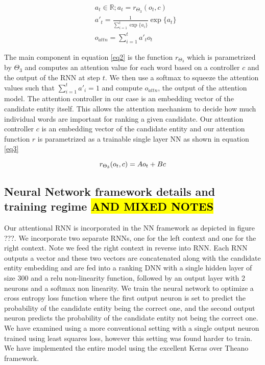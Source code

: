 \documentclass[11pt]{article}
\begin{document}
\begin{equation}
	\label{eq2}
	\begin{aligned}
	& a_t \in \mathbb{R}; a_t=r_{\Theta_3}(o_t, c) \\
	& a'_t  = \frac{1}{\sum_{i=1}^{t} \exp\{a_i\}} \exp \{a_t\} \\
	& o_{attn}=\sum_{i=1}^{t} a'_t o_t
	\end{aligned}
\end{equation}

The main component in equation \ref{eq2} is the function $r_{\Theta_3}$ which is parametrized by $\Theta_3$ and computes an attention value for each word based on a controller $c$ and the output of the RNN at step $t$. We then use a softmax to squeeze the attention values such that $\sum_{i=1}^{t} a'_i = 1$ and compute $o_{attn}$, the output of the attention model. The attention controller in our case is an embedding vector of the candidate entity itself. This allows the attention mechanism to decide how much individual words are important for ranking a given candidate. Our attention controller $c$ is an embedding vector of the candidate entity and our attention function $r$ is parametrized as a trainable single layer NN as shown in equation \ref{eq3}

\begin{equation}
\label{eq3}
r_{\Theta_3}(o_t, c) = Ao_t + Bc \\
\end{equation}

\subsection{Neural Network framework details and training regime \hl{AND MIXED NOTES}}
Our attentional RNN is incorporated in the NN framework as depicted in figure ???. We incorporate two separate RNNs, one for the left context and one for the right context. Note we feed the right context in reverse into RNN. Each RNN outputs a vector and these two vectors are concatenated along with the candidate entity embedding and are fed into a ranking DNN with a single hidden layer of size 300 and a relu non-linearity function, followed by an output layer with 2 neurons and a softmax non linearity. We train the neural network to optimize a cross entropy loss function where the first output neuron is set to predict the probability of the candidate entity being the correct one, and the second output neuron predicts the probability of the candidate entity not being the correct one. We have examined using a more conventional setting with a single output neuron trained using least squares loss, however this setting was found harder to train. We have implemented the entire model using the excellent Keras \cite{chollet2015} over Theano \cite{team2016theano} framework.
\end{document}
